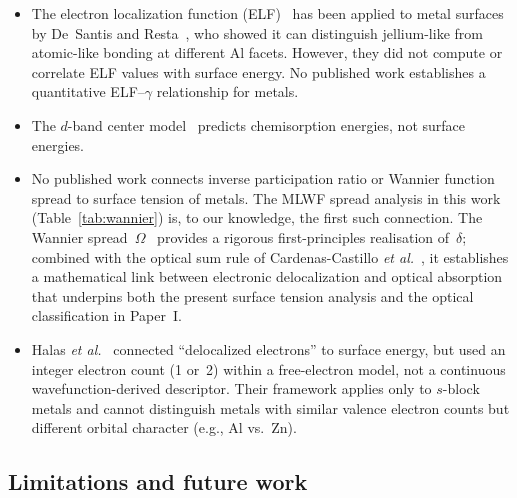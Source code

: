 \documentclass[twocolumn,showpacs,preprintnumbers,amsmath,amssymb,prb]{revtex4-2}
\begin{document}
\begin{itemize}
  \item The electron localization function
    (ELF)~\cite{BeckeEdgecombe1990} has been applied to
    metal surfaces by De~Santis and
    Resta~\cite{DeSantisResta2000}, who showed it can
    distinguish jellium-like from atomic-like bonding at
    different Al facets.
    However, they did not compute or correlate ELF values
    with surface energy.
    No published work establishes a quantitative
    ELF--$\gamma$ relationship for metals.
  \item The $d$-band center model~\cite{Hammer1995} predicts
    chemisorption energies, not surface energies.
  \item No published work connects inverse participation ratio
    or Wannier function spread to surface tension of metals.
    The MLWF spread analysis in this work
    (Table~\ref{tab:wannier}) is, to our knowledge,
    the first such connection.
    The Wannier spread~$\Omega$~\cite{Marzari1997} provides
    a rigorous first-principles realisation of~$\delta$; combined
    with the optical sum rule of Cardenas-Castillo
    \textit{et al.}~\cite{CardenasCastillo2024}, it establishes
    a mathematical link between electronic delocalization and
    optical absorption that underpins both the present surface
    tension analysis and the optical classification in Paper~I.
  \item Halas \textit{et al.}~\cite{Halas2002} connected
    ``delocalized electrons'' to surface energy, but used an
    integer electron count (1 or~2) within a free-electron
    model, not a continuous wavefunction-derived descriptor.
    Their framework applies only to $s$-block metals and
    cannot distinguish metals with similar valence electron
    counts but different orbital character (e.g., Al vs.\ Zn).
\end{itemize}

\subsection{Limitations and future work}
\end{document}

